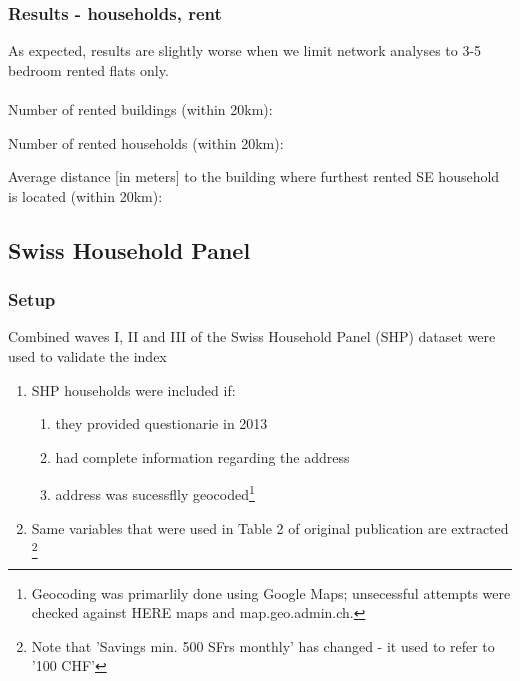 \documentclass[a4paper, notitlepage, fleqn]{article} %
\begin{document}
{\subsubsection{Results - households, rent}
As expected, results are slightly worse when we limit network analyses to 3-5 bedroom rented flats only. \\
\\
Number of rented buildings (within 20km):
\begin{stlog}\end{stlog}
Number of rented households (within 20km):
\begin{stlog}\end{stlog}
Average distance [in meters] to the building where furthest rented SE household is located (within 20km):
\begin{stlog}\end{stlog}
\newpage
\subsection{Swiss Household Panel}
\subsubsection{Setup}

Combined waves I, II and III of the Swiss Household Panel (SHP) dataset were used to validate the index

\begin{enumerate}

	\item SHP households were included if: 

	\begin{enumerate}	
		\item they provided questionarie in 2013 
		\item had complete information regarding the address
		\item address was sucessflly geocoded\footnote{Geocoding 
			was primarlily done using Google Maps; unsecessful attempts were checked against HERE maps and map.geo.admin.ch.}
	\end{enumerate}	
		
	\item Same variables that were used in Table 2 of original publication are extracted
		\footnote{Note that 'Savings min. 500 SFrs monthly' has changed - it used to refer to '100 CHF'}	
		

\end{enumerate}}
\end{document}
